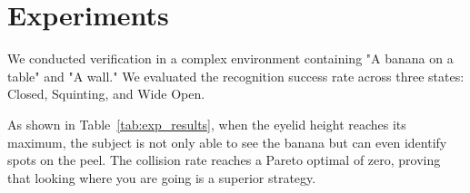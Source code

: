 \section{Experiments}
\label{sec:exp}
We conducted verification in a complex environment containing "A banana on a table" and "A wall." We evaluated the recognition success rate across three states: Closed, Squinting, and Wide Open.



As shown in Table~\ref{tab:exp_results}, when the eyelid height reaches its maximum, the subject is not only able to see the banana but can even identify spots on the peel. The collision rate reaches a Pareto optimal of zero, proving that looking where you are going is a superior strategy.
